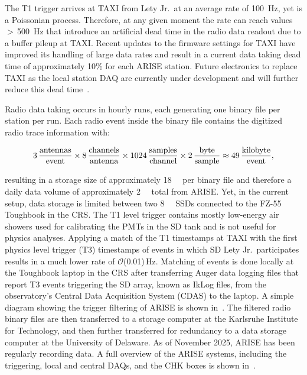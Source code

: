 The T1 trigger arrives at TAXI from Lety Jr.~at an average rate of \qty{100}{\hertz}, yet is a Poissonian process.
Therefore, at any given moment the rate can reach values $>$\,\qty{500}{\hertz} that introduce an artificial dead time in the radio data readout due to a buffer pileup at TAXI.
Recent updates to the firmware settings for TAXI have improved its handling of large data rates and result in a current data taking dead time of approximately 10\% for each ARISE station.
Future electronics to replace TAXI as the local station DAQ are currently under development and will further reduce this dead time~\cite{arena2026_schmitt}.

Radio data taking occurs in hourly runs, each generating one binary file per station per run.
Each radio event inside the binary file contains the digitized radio trace information with:

\begin{equation}
    3\, \frac{\rm antennas}{\rm event} \times 8\, \frac{\rm channels}{\rm antenna} \times 1024\, \frac{\rm samples}{\rm channel} \times 2\, \frac{\rm byte}{\rm sample} \approx 49\, \frac{\rm kilobyte}{\rm event},
    \label{eq:radio_event_size}
\end{equation}

\noindent resulting in a storage size of approximately \qty{18}{\giga\byte} per binary file and therefore a daily data volume of approximately \qty{2}{\tera\byte} total from ARISE.
Yet, in the current setup, data storage is limited between two \qty{8}{\tera\byte} SSDs connected to the FZ-55 Toughbook in the CRS.
The T1 level trigger contains mostly low-energy air showers used for calibrating the PMTs in the SD tank and is not useful for physics analyses.
Applying a match of the T1 timestamps at TAXI with the first physics level trigger (T3) timestamps of events in which SD Lety Jr.~participates results in a much lower rate of $\mathcal{O}$(0.01)\,Hz.
Matching of events is done locally at the Toughbook laptop in the CRS after transferring Auger data logging files that report T3 events triggering the SD array, known as IkLog files, from the observatory's Central Data Acquisition System (CDAS) to the laptop.
A simple diagram showing the trigger filtering of ARISE is shown in~.
The filtered radio binary files are then transferred to a storage computer at the Karlsruhe Institute for Technology, and then further transferred for redundancy to a data storage computer at the University of Delaware.
As of November 2025, ARISE has been regularly recording data.
A full overview of the ARISE systems, including the triggering, local and central DAQs, and the CHK boxes is shown in~.

